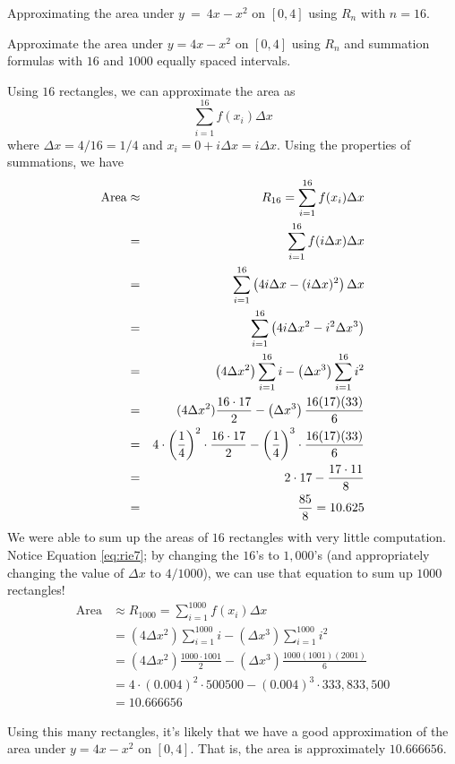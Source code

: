 \begin{marginfigure}[8cm] %
\caption{Approximating the area under $y~=~4x-x^2$ on $[0,4]$ using $R_n$ with $n=16$.} \label{fig:apex_5-3_Area1Rn16}
\end{marginfigure}

\begin{example} %
Approximate the area under $y=4x-x^2$ on $[0,4]$ using $R_n$ and summation formulas with $16$ and $1000$ equally spaced intervals.

\solution Using $16$ rectangles, we can approximate the area as 
\[ \sum_{i=1}^{16} f(x_i) \Delta x \]
where $\Delta x = 4/16 = 1/4$ and $x_i = 0 + i \Delta x = i \Delta x$. Using the properties of summations, we have
\begin{eqnarray}
\mbox{Area} & \approx & R_{16}  = \sum_{i=1}^{16} f(x_i) \Delta x \notag \\
&=& \sum_{i=1}^{16} f( i\Delta x ) \Delta x \notag \\
&=& \sum_{i=1}^{16} \left( 4i \Delta x - (i \Delta x)^2 \right) \Delta x \notag \\
&=& \sum_{i=1}^{16} \left( 4i \Delta x^2 - i^2 \Delta x^3 \right) \notag \\		
&=& \left( 4\Delta x^2 \right) \sum_{i=1}^{16} i - \left( \Delta x^3 \right) \sum_{i=1}^{16} i^2 \label{eq:rie7} \\ %
&=& (4\Delta x^2)\frac{16\cdot 17}{2} - \left( \Delta x^3 \right) \frac{16(17)(33)}6 \notag \\
&=&	4 \cdot \left( \frac{1}{4} \right)^2 \cdot \frac{16\cdot 17}{2} - \left( \frac{1}{4} \right)^3 \cdot \frac{16(17)(33)}{6} \notag \\
&=&	2 \cdot 17 - \frac{17 \cdot 11}{8} \notag \\
&=& \frac{85}{8} = 10.625 \notag
\end{eqnarray}
We were able to sum up the areas of $16$ rectangles with very little computation. Notice  Equation \eqref{eq:rie7}; by changing the $16$'s to $1,000$'s (and appropriately changing the value of $\Delta x$ to $4/1000$), we can use that equation to sum up $1000$ rectangles!
\begin{align*}
\mbox{Area} & \approx R_{1000} = \sum_{i=1}^{1000} f(x_i) \Delta x \\
&= \left( 4 \Delta x^2 \right) \sum_{i=1}^{1000} i - \left(\Delta x^3 \right) \sum_{i=1}^{1000} i^2 \\
&= \left( 4 \Delta x^2 \right) \frac{1000 \cdot 1001}{2} - \left( \Delta x^3 \right) \frac{1000(1001)(2001)}6 \\
&= 4 \cdot (0.004)^2 \cdot 500500 - (0.004)^3\cdot 333,833,500\\
&= 10.666656
\end{align*}

Using this many rectangles, it's likely that we have a good approximation of the area under $y=4x-x^2$ on $[0,4]$. That is, the area is approximately $10.666656$.
\end{example}